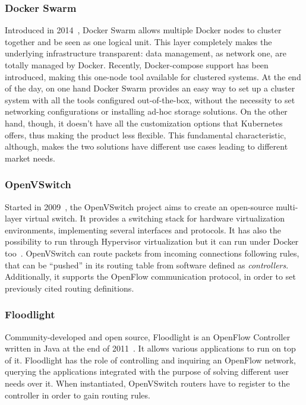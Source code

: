 \subsubsection{Docker Swarm}
\label{chap:prjan:sec:tech:sub:other:sub:swarm}
Introduced in 2014~\cite{swarmGit}, Docker Swarm allows multiple Docker nodes to
cluster together and be seen as one logical unit. This layer completely makes
the underlying infrastructure transparent: data management, as network one, are
totally managed by Docker. Recently, Docker-compose support has been introduced,
making this one-node tool available for clustered systems. At the end of the
day, on one hand Docker Swarm provides an easy way to set up a cluster system
with all the tools configured out-of-the-box, without the necessity to set
networking configurations or installing ad-hoc storage solutions. On the other
hand, though, it doesn't have all the customization options that Kubernetes
offers, thus making the product less flexible. This fundamental characteristic,
although, makes the two solutions have different use cases leading to different
market needs.

\subsubsection{OpenVSwitch}
Started in 2009~\cite{ovsGit}, the OpenVSwitch project aims to create an
open-source multi-layer virtual switch. It provides a switching stack for
hardware virtualization environments, implementing several interfaces and
protocols. It has also the possibility to run through Hypervisor virtualization
but it can run under Docker too~\cite{ovsDocker}. OpenVSwitch can route packets
from incoming connections following rules, that can be ``pushed'' in its routing
table from software defined as \textit{controllers}. Additionally, it supports
the OpenFlow communication protocol, in order to set previously cited routing
definitions.

\subsubsection{Floodlight}
\label{chap:prjan:sec:tech:sub:other:sub:floodlight}
Community-developed and open source, Floodlight is an OpenFlow Controller
written in Java at the end of 2011~\cite{floodlightGit}. It allows various
applications to run on top of it. Floodlight has the role of controlling and
inquiring an OpenFlow network, querying the applications integrated with the
purpose of solving different user needs over it. When instantiated, OpenVSwitch
routers have to register to the controller in order to gain routing rules.


